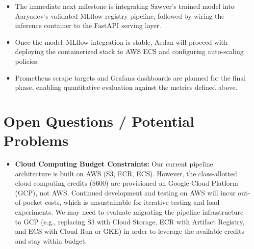 \documentclass[10pt]{article}
\begin{document}
\begin{itemize}[leftmargin=*]

\item The immediate next milestone is integrating Sawyer's trained model into Aaryadev's validated MLflow registry pipeline, followed by wiring the inference container to the FastAPI serving layer.

\item Once the model--MLflow integration is stable, Aedan will proceed with deploying the containerized stack to AWS ECS and configuring auto-scaling policies.

\item Prometheus scrape targets and Grafana dashboards are planned for the final phase, enabling quantitative evaluation against the metrics defined above.

\end{itemize}

\section*{Open Questions / Potential Problems}

\begin{itemize}[leftmargin=*]

\item \textbf{Cloud Computing Budget Constraints:} Our current pipeline architecture is built on AWS (S3, ECR, ECS). However, the class-allotted cloud computing credits (\$600) are provisioned on Google Cloud Platform (GCP), not AWS. Continued development and testing on AWS will incur out-of-pocket costs, which is unsustainable for iterative testing and load experiments. We may need to evaluate migrating the pipeline infrastructure to GCP (e.g., replacing S3 with Cloud Storage, ECR with Artifact Registry, and ECS with Cloud Run or GKE) in order to leverage the available credits and stay within budget.

\end{itemize}
\end{document}
